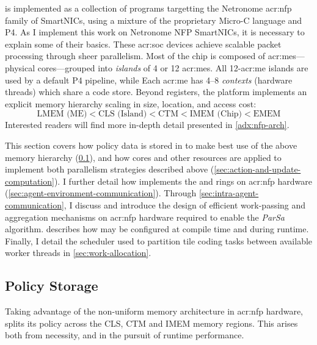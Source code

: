 \approachshort{} is implemented as a collection of programs targetting the Netronome \gls{acr:nfp} family of SmartNICs, using a mixture of the proprietary Micro-C language and P4.
As I implement this work on Netronome NFP SmartNICs, it is necessary to explain some of their basics.
These \gls{acr:soc} devices achieve scalable packet processing through sheer parallelism.
Most of the chip is composed of \glspl{acr:me}---physical cores---grouped into \emph{islands} of 4 or 12 \glspl{acr:me}.
All 12-\gls{acr:me} islands are used by a default P4 pipeline, while 
Each \gls{acr:me} has \numrange{4}{8} \emph{contexts} (hardware threads) which share a code store.
Beyond registers, the platform implements an explicit memory hierarchy scaling in size, location, and access cost:
$$\text{LMEM (ME)} < \text{CLS (Island)} < \text{CTM} < \text{IMEM (Chip)} < \text{EMEM}$$
Interested readers will find more in-depth detail presented in \cref{adx:nfp-arch}.

This section covers how policy data is stored in \approachshort{} to make best use of the above memory hierarchy (\cref{sec:policy-storage}), and how cores and other resources are applied to implement both parallelism strategies described above (\cref{sec:action-and-update-computation}).
I further detail how \approachshort{} implements the \inring{} and \outring{} rings on \gls{acr:nfp} hardware (\cref{sec:agent-environment-communication}).
Through \cref{sec:intra-agent-communication}, I discuss and introduce the design of efficient work-passing and aggregation mechanisms on \gls{acr:nfp} hardware required to enable the \emph{ParSa} algorithm.
 describes how \approachshort{} may be configured at compile time and during runtime.
Finally, I detail the scheduler used to partition tile coding tasks between available worker threads in \cref{sec:work-allocation}.


\subsection{Policy Storage}\label{sec:policy-storage}
Taking advantage of the non-uniform memory architecture in \gls{acr:nfp} hardware, \approachshort{} splits its policy across the CLS, CTM and IMEM memory regions.
This arises both from necessity, and in the pursuit of runtime performance.

